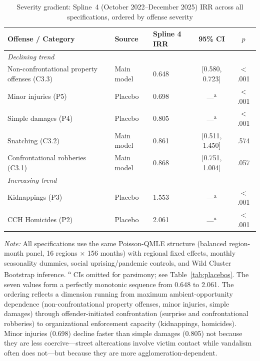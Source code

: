 \documentclass[pdflatex,sn-basic]{sn-jnl}
\newcommand{\tablenote}[1]{%
  \vspace{2pt}%
  {\par\footnotesize\textit{Note:} #1\par}%
}
\begin{document}
\begin{table}[htbp]
\centering
\caption{Severity gradient: Spline~4 (October 2022--December 2025) IRR across all specifications, ordered by offense severity}
\label{tab:gradiente}
\footnotesize
\begin{tabular}{lllcc}
\toprule
\textbf{Offense / Category} & \textbf{Source} & \textbf{Spline 4 IRR} & \textbf{95\% CI} & $p$ \\
\midrule
\multicolumn{5}{l}{\textit{Declining trend}} \\
Non-confrontational property offenses (C3.3) & Main model & 0.648 & [0.580, 0.723] & $<$.001 \\
Minor injuries (P5)          & Placebo    & 0.698 & ---\textsuperscript{a}            & $<$.001 \\
Simple damages (P4)          & Placebo    & 0.805 & ---\textsuperscript{a}            & $<$.001 \\
Snatching (C3.2)    & Main model & 0.861 & [0.511, 1.450] & .574 \\
Confrontational robberies (C3.1)     & Main model & 0.868 & [0.751, 1.004] & .057 \\
\midrule
\multicolumn{5}{l}{\textit{Increasing trend}} \\
Kidnappings (P3)             & Placebo    & 1.553 & ---\textsuperscript{a}            & $<$.001 \\
CCH Homicides (P2)           & Placebo    & 2.061 & ---\textsuperscript{a}            & $<$.001 \\
\bottomrule
\end{tabular}
\tablenote{All specifications use the same Poisson-QMLE structure (balanced region-month panel, 16 regions $\times$ 156 months) with regional fixed effects, monthly seasonality dummies, social uprising/pandemic controls, and Wild Cluster Bootstrap inference. \textsuperscript{a} CIs omitted for parsimony; see Table~\ref{tab:placebos}. The seven values form a perfectly monotonic sequence from 0.648 to 2.061. The ordering reflects a dimension running from maximum ambient-opportunity dependence (non-confrontational property offenses, minor injuries, simple damages) through offender-initiated confrontation (surprise and confrontational robberies) to organizational enforcement capacity (kidnappings, homicides). Minor injuries (0.698) decline faster than simple damages (0.805) not because they are less coercive---street altercations involve victim contact while vandalism often does not---but because they are more agglomeration-dependent.}
\end{table}
\end{document}
